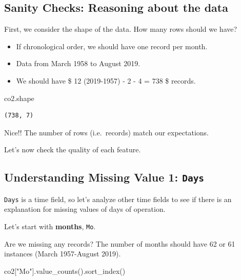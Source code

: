 \documentclass[
  letterpaper,
  DIV=11,
  numbers=noendperiod]{scrreprt}
\newenvironment{Shaded}{\begin{snugshade}}{\end{snugshade}}
\newcommand{\NormalTok}[1]{\textcolor[rgb]{0.00,0.23,0.31}{#1}}
\newcommand{\StringTok}[1]{\textcolor[rgb]{0.13,0.47,0.30}{#1}}
\providecommand{\tightlist}{%
  \setlength{\itemsep}{0pt}\setlength{\parskip}{0pt}}\usepackage{longtable,booktabs,array}
\begin{document}
\subsection{Sanity Checks: Reasoning about the
data}\label{sanity-checks-reasoning-about-the-data}

First, we consider the shape of the data. How many rows should we have?

\begin{itemize}
\tightlist
\item
  If chronological order, we should have one record per month.
\item
  Data from March 1958 to August 2019.
\item
  We should have \$ 12 \times (2019-1957) - 2 - 4 = 738 \$ records.
\end{itemize}

\begin{Shaded}
\begin{Highlighting}[]
\NormalTok{co2.shape}
\end{Highlighting}
\end{Shaded}

\begin{verbatim}
(738, 7)
\end{verbatim}

Nice!! The number of rows (i.e.~records) match our expectations.

Let's now check the quality of each feature.

\subsection{\texorpdfstring{Understanding Missing Value 1:
\texttt{Days}}{Understanding Missing Value 1: Days}}\label{understanding-missing-value-1-days}

\texttt{Days} is a time field, so let's analyze other time fields to see
if there is an explanation for missing values of days of operation.

Let's start with \textbf{months}, \texttt{Mo}.

Are we missing any records? The number of months should have 62 or 61
instances (March 1957-August 2019).

\begin{Shaded}
\begin{Highlighting}[]
\NormalTok{co2[}\StringTok{"Mo"}\NormalTok{].value\_counts().sort\_index()}
\end{Highlighting}
\end{Shaded}
\end{document}
